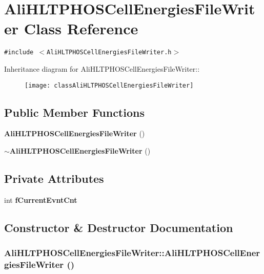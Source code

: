 \section{Ali\-HLTPHOSCell\-Energies\-File\-Writer Class Reference}
\label{classAliHLTPHOSCellEnergiesFileWriter}
{\tt \#include $<$Ali\-HLTPHOSCell\-Energies\-File\-Writer.h$>$}

Inheritance diagram for Ali\-HLTPHOSCell\-Energies\-File\-Writer::\begin{figure}[H]
\begin{center}
\leavevmode
\texttt{[image: classAliHLTPHOSCellEnergiesFileWriter]}
\end{center}
\end{figure}
\subsection*{Public Member Functions}
\begin{CompactItemize}
\item 
{\bf Ali\-HLTPHOSCell\-Energies\-File\-Writer} ()
\item 
{\bf $\sim$Ali\-HLTPHOSCell\-Energies\-File\-Writer} ()
\end{CompactItemize}
\subsection*{Private Attributes}
\begin{CompactItemize}
\item 
int {\bf f\-Current\-Evnt\-Cnt}
\end{CompactItemize}


\subsection{Constructor \& Destructor Documentation}
\subsubsection{\setlength{\rightskip}{0pt plus 5cm}Ali\-HLTPHOSCell\-Energies\-File\-Writer::Ali\-HLTPHOSCell\-Energies\-File\-Writer ()}\label{classAliHLTPHOSCellEnergiesFileWriter_a0}




